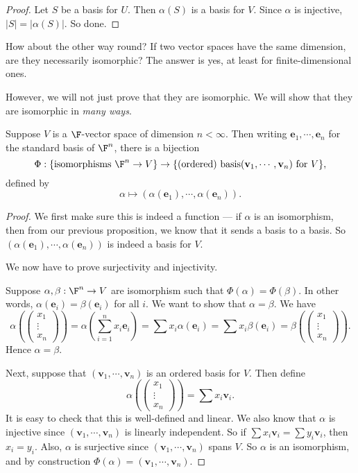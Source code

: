 \documentclass[a4paper]{article}
\begin{document}
\begin{proof}
  Let $S$ be a basis for $U$. Then $\alpha(S)$ is a basis for $V$. Since $\alpha$ is injective, $|S| = |\alpha(S)|$. So done.
\end{proof}

How about the other way round? If two vector spaces have the same dimension, are they necessarily isomorphic? The answer is yes, at least for finite-dimensional ones.

However, we will not just prove that they are isomorphic. We will show that they are isomorphic in \emph{many ways}.
\begin{prop}
  Suppose $V$ is a $\F$-vector space of dimension $n < \infty$. Then writing $\mathbf{e}_1,\cdots, \mathbf{e}_n$ for the standard basis of $\F^n$, there is a bijection
  \[
    \Phi: \{\text{isomorphisms }\F^n \to V\} \to \{\text{(ordered) basis} (\mathbf{v}_1, \cdots, \mathbf{v}_n)\text{ for }V\},
  \]
  defined by
  \[
    \alpha \mapsto (\alpha (\mathbf{e}_1), \cdots, \alpha(\mathbf{e}_n)).
  \]
\end{prop}

\begin{proof}
  We first make sure this is indeed a function --- if $\alpha$ is an isomorphism, then from our previous proposition, we know that it sends a basis to a basis. So $(\alpha(\mathbf{e}_1), \cdots, \alpha(\mathbf{e}_n))$ is indeed a basis for $V$.

  We now have to prove surjectivity and injectivity.

  Suppose $\alpha, \beta: \F^n \to V$ are isomorphism such that $\Phi(\alpha) = \Phi(\beta)$. In other words, $\alpha (\mathbf{e}_i) = \beta(\mathbf{e}_i)$ for all $i$. We want to show that $\alpha = \beta$. We have
  \[
    \alpha\left(
    \begin{pmatrix}
      x_1\\\vdots\\x_n
    \end{pmatrix}
    \right) = \alpha \left(\sum_{i = 1}^n x_i \mathbf{e}_i\right) = \sum x_i \alpha (\mathbf{e}_i) = \sum x_i \beta (\mathbf{e}_i) = \beta\left(
    \begin{pmatrix}
      x_1\\\vdots\\x_n
    \end{pmatrix}\right).
  \]
  Hence $\alpha = \beta$.

  Next, suppose that $(\mathbf{v}_1, \cdots, \mathbf{v}_n)$ is an ordered basis for $V$. Then define
  \[
    \alpha\left(
    \begin{pmatrix}
      x_1\\\vdots\\x_n
    \end{pmatrix}
    \right) = \sum x_i \mathbf{v}_i.
  \]
  It is easy to check that this is well-defined and linear. We also know that $\alpha$ is injective since $(\mathbf{v}_1, \cdots, \mathbf{v}_n)$ is linearly independent. So if $\sum x_i \mathbf{v}_i = \sum y_i \mathbf{v}_i$, then $x_i = y_i$. Also, $\alpha$ is surjective since $(\mathbf{v}_1, \cdots, \mathbf{v}_n)$ spans $V$. So $\alpha$ is an isomorphism, and by construction $\Phi(\alpha) = (\mathbf{v}_1, \cdots, \mathbf{v}_n)$.
\end{proof}
\end{document}
